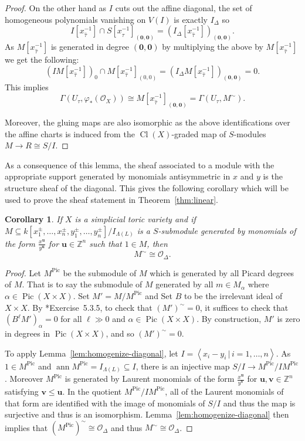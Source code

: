 \documentclass{amsart}
\newcommand{\cO}{\mathcal O}
\newcommand{\ZZ}{\mathbb{Z}}
\newcommand{\field}{k}
\DeclareMathOperator{\Pic}{Pic}
\DeclareMathOperator{\Cl}{Cl}
\newtheorem{corollary}[theorem]{Corollary}
\theoremstyle{remark}
\begin{document}
\begin{proof}
  On the other hand as $I$ cuts out the affine diagonal, the set of homogeneous polynomials vanishing on $V(I)$ is exactly $I_\Delta$ so
  \[I[x_{\widehat{\tau}}^{-1}] \cap S[x_{\widehat{\tau}}^{-1}]_{(\bm{0},\bm{0})} = (I_{\Delta}[x_{\widehat{\tau}}^{-1}])_{(\bm{0},\bm{0})}.\]
  As $M[x_{\widehat{\tau}}^{-1}]$ is generated in degree $(\bm{0},\bm{0})$ by multiplying the above by $M[x_{\widehat{\tau}}^{-1}]$ we get the following:
  \[(IM[x_{\widehat{\tau}}^{-1}])_0 \cap M[x_{\widehat{\tau}}^{-1}]_{(0,0)} = (I_{\Delta}M[x_{\widehat{\tau}}^{-1}])_{(\bm{0},\bm{0})} = 0.\]
  This implies
  \[\Gamma(U_\tau,\varphi_*(\cO_X)) \cong  M[x_{\widehat{\tau}}^{-1}]_{(\bm{0},\bm{0})} = \Gamma(U_\tau,M^{\sim}).\]

  Moreover, the gluing maps are also isomorphic as the above identifications over the affine charts is induced from the $\Cl(X)$-graded map of $S$-modules $M\rightarrow R \cong S/I$.
\end{proof}

As a consequence of this lemma, the sheaf associated to a module with the appropriate support generated by monomials antisymmetric in $x$ and $y$ is the structure sheaf of the diagonal. This gives the following corollary which will be used to prove the sheaf statement in Theorem~\ref{thm:linear}.
\begin{corollary}
  \label{cor:lawrence-diagonal}
  If $X$ is a simplicial toric variety and if $M\subseteq \field[x_1^\pm,\ldots,x_n^\pm,y_1^\pm,\ldots,y_n^\pm]/I_{\Lambda(L)}$ is a $S$-submodule generated by monomials of the form $\frac{x^{\bm{u}}}{y^{\bm{u}}}$ for $\bm{u}\in \ZZ^n$ such that $1\in M$, then
  \[M^\sim \cong \cO_{\Delta}.\]
\end{corollary}
\begin{proof}
  Let $M^{\Pic}$ be the submodule of $M$ which is generated by all Picard degrees of $M$.
  That is to say the submodule of $M$ generated by all $m\in M_{\alpha}$ where $\alpha\in \Pic(X\times X)$.
  Set $M' = M/M^{\Pic}$ and Set $B$ to be the irrelevant ideal of $X\times X$. By \cite{CLS11}*{Exercise~5.3.5},
  to check that $(M')^{\sim} = 0$, it suffices to check that $(B^{\ell}M')_{\alpha} = 0$ for all $\ell\gg 0$
  and $\alpha\in \Pic(X\times X)$. By construction, $M'$ is zero in degrees in $\Pic(X\times X)$, and so $(M')^{\sim}=0$.

  To apply Lemma~\ref{lem:homogenize-diagonal}, let $I=\left<x_i-y_i \,|\, i=1,\ldots,n\right>$.
  As $1\in M^{\Pic}$ and $\operatorname{ann} M^{\Pic} = I_{\Lambda(L)}\subseteq I$,
  there is an injective map $S/I \rightarrow M^{\Pic}/IM^{\Pic}$.
  Moreover $M^{\Pic}$ is generated by Laurent monomials of the form  $\frac{x^{\bm{u}}}{y^{\bm{v}}}$
  for $\bm{u},\bm{v}\in \ZZ^n$ satisfying $\bm{v}\leq \bm{u}$. In the quotient $M^{\Pic}/IM^{\Pic}$,
  all of the Laurent monomials of that form are identified with the image of monomials of $S/I$
  and thus the map is surjective and thus is an isomorphism.
  Lemma~\ref{lem:homogenize-diagonal} then implies that $(M^{\Pic})^{\sim} \cong \cO_\Delta$ and thus $M^{\sim} \cong \cO_{\Delta}$.
  
\end{proof}
\end{document}
